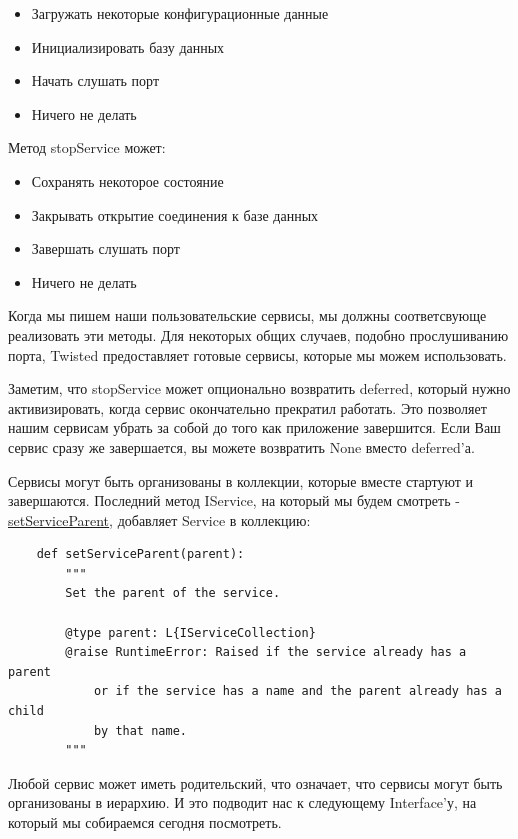 \begin{itemize}
\item Загружать некоторые конфигурационные данные
\item Инициализировать базу данных
\item Начать слушать порт
\item Ничего не делать 
\end{itemize}


Метод stopService может:

\begin{itemize}
\item Сохранять некоторое состояние
\item Закрывать открытие соединения к базе данных
\item Завершать слушать порт
\item Ничего не делать 
\end{itemize}


Когда мы пишем наши пользовательские сервисы, мы должны 
соответсвующе реализовать эти методы. 
Для некоторых общих случаев, подобно прослушиванию порта, 
Twisted предоставляет готовые сервисы, которые мы можем использовать. 


Заметим, что stopService может опционально возвратить deferred, 
который нужно активизировать, когда сервис окончательно 
прекратил работать. Это позволяет нашим сервисам убрать за собой 
до того как приложение завершится. Если Ваш сервис сразу же завершается, 
вы можете возвратить None вместо deferred'а.  


Сервисы могут быть организованы в коллекции, которые вместе  
стартуют и завершаются. Последний метод IService, на который мы будем 
смотреть - 
\href{http://twistedmatrix.com/trac/browser/tags/releases/twisted-10.0.0/twisted/application/service.py#L107}{setServiceParent}, добавляет Service в коллекцию:

\begin{scriptsize}\begin{verbatim}
    def setServiceParent(parent):
        """
        Set the parent of the service.

        @type parent: L{IServiceCollection}
        @raise RuntimeError: Raised if the service already has a parent
            or if the service has a name and the parent already has a child
            by that name.
        """
\end{verbatim}\end{scriptsize}


Любой сервис может иметь родительский, что означает, что 
сервисы могут быть организованы в иерархию. И это подводит нас 
к следующему Interface'у, на который мы собираемся сегодня посмотреть.


